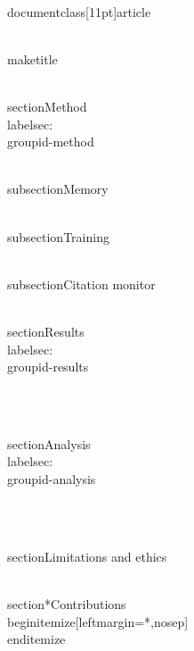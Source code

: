 \\documentclass[11pt]{article}
\begin{document}
\\maketitle

\\section{Method}
\\label{sec:\\groupid-method}

\\subsection{Memory}
\

\\subsection{Training}
\

\\subsection{Citation monitor}
\

\\section{Results}
\\label{sec:\\groupid-results}

\

\\section{Analysis}
\\label{sec:\\groupid-analysis}

\

\\section{Limitations and ethics}
\

\\section*{Contributions}
\\begin{itemize}[leftmargin=*,nosep]
\
\
\
\\end{itemize}

\
\end{document}
